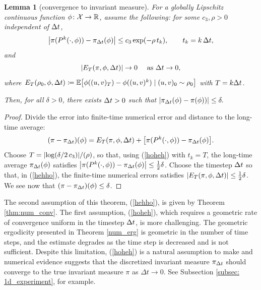 \documentclass[11pt, twoside]{report}
\newtheorem{lemma}[theorem]{Lemma}
\begin{document}
\begin{lemma}[convergence to invariant measure]\label{lem_convergence_to_invariant} For a globally Lipschitz continuous function $\phi\colon\mathcal X\to \mathbb{R}$, assume the following:  for some $c_3,\rho>0$ independent of ${\Delta t}$, 
  \begin{equation}
    \left\lvert\pi(P^k(\cdot,\phi))-\pi_{\Delta t}(\phi)\right\rvert\le c_3 \exp(- \rho \,t_k), \qquad t_k=k\,{\Delta t},\label{hoheh}
\end{equation}
and
\begin{equation}
  \left\lvert E_T(\pi,\phi,{\Delta t})\right\rvert
  \to 0 \quad \text{ as ${\Delta t} \to 0$,}\label{hehho}
  \end{equation}
  where   $E_T(\rho_0,\phi,\tstep)\coloneq \mean{
    \phi((u,v)_T)-\phi((u,v)^k) \mid (u,v)_0\sim \rho_0}$ with $T=k{\Delta t}$.

   Then,   for all $\delta>0$, there exists ${\Delta t}>0$ such that
  $\left\lvert\pi_{{\Delta t}}(\phi)- \pi(\phi))\right\rvert \le \delta.
  $
  \end{lemma}
  \begin{proof} Divide the error into finite-time numerical error and distance to the long-time average:
\begin{equation*}
(\pi-\pi_\tstep)(\phi)
= E_T(\pi,\phi,\tstep)+\bp{\pi(P^k(\cdot,\phi))-\pi_\tstep(\phi)}.
\end{equation*}
Choose $T=\abs{\log(\delta/2\,c_3)}/(\rho)$, so that, using (\ref{hoheh}) with $t_k=T$, the long-time average $\pi_{\Delta t}(\phi)$ satisfies
  $\left\lvert\pi(P^k(\cdot,\phi))-\pi_{\Delta t}(\phi)\right\rvert\le  \frac12\delta$.
  Choose the timestep ${\Delta t}$ so that, in (\ref{hehho}),  the finite-time numerical errors satisfies $\left\lvert E_T(\pi,\phi,{\Delta t})\right\rvert
  \le  \frac 12\delta$. We see now that $
(\pi-\pi_{\Delta t})(\phi)\le \delta$.
  \end{proof}

The second assumption of this theorem, (\ref{hehho}), is given by Theorem \ref{thm:num_conv}.
The first assumption, (\ref{hoheh}), which requires a geometric rate of convergence uniform in the timestep ${\Delta t}$, is more challenging. The geometric ergodicity presented in Theorem \ref{num_erg} is geometric in the number of time steps, and the estimate degrades as the time step is decreased and is not sufficient. Despite this limitation, (\ref{hoheh}) is a natural assumption to make and numerical evidence suggests that the discretized invariant measure $\pi_{{\Delta t}}$ should converge to the true invariant measure $\pi$ as $\Delta t \to 0$. See Subsection \ref{subsec: 1d_experiment}, for example.
\end{document}

